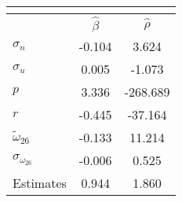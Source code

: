 \begin{tabular}{l*{2}{c}} 
\multicolumn{3}{c}{} \\ \toprule 
& $\hat{\beta}$ & $\hat{\rho}$ \\ \cmidrule(lr){2-3} 
  $\sigma_{n}$ & -0.104 & 3.624 \\ 
  $\sigma_{u}$ & 0.005 & -1.073 \\ 
  $p$ & 3.336 & -268.689 \\ 
  $r$ & -0.445 & -37.164 \\ 
  $\tilde{\omega}_{26}$ & -0.133 & 11.214 \\ 
  $\sigma_{\omega_{26}}$ & -0.006 & 0.525 \\ 
 \midrule Estimates& 0.944 & 1.860 \\ \bottomrule 
 \end{tabular}